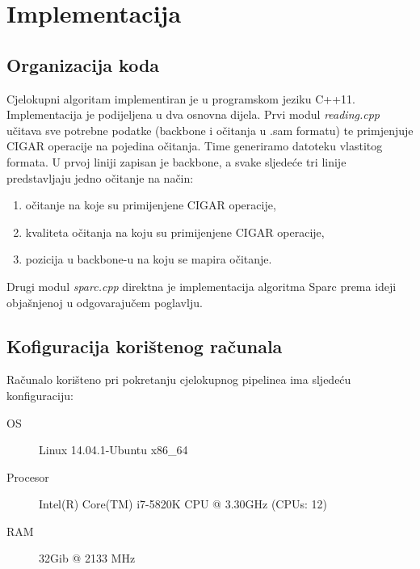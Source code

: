 \chapter{Implementacija}
\label{sec:implementacija}

\section{Organizacija koda}
Cjelokupni algoritam implementiran je u programskom jeziku C++11.
Implementacija je podijeljena u dva osnovna dijela.
Prvi modul \emph{reading.cpp} učitava sve potrebne podatke (backbone i očitanja u .sam formatu) te primjenjuje CIGAR operacije na pojedina očitanja.
Time generiramo datoteku vlastitog formata.
U prvoj liniji zapisan je backbone, a svake sljedeće tri linije predstavljaju jedno očitanje na način:
\begin{enumerate}
  \item očitanje na koje su primijenjene CIGAR operacije,
  \item kvaliteta očitanja na koju su primijenjene CIGAR operacije,
  \item pozicija u backbone-u na koju se mapira očitanje.
\end{enumerate}

Drugi modul \emph{sparc.cpp} direktna je implementacija algoritma Sparc prema ideji objašnjenoj u odgovarajučem poglavlju. 

\section{Kofiguracija korištenog računala}

Računalo korišteno pri pokretanju cjelokupnog pipelinea ima sljedeću konfiguraciju:
\begin{description}
  \item [OS] Linux 14.04.1-Ubuntu x86\_64
  \item [Procesor] Intel(R) Core(TM) i7-5820K CPU @ 3.30GHz (CPUs: 12)
  \item [RAM] 32Gib @ 2133 MHz
\end{description}

